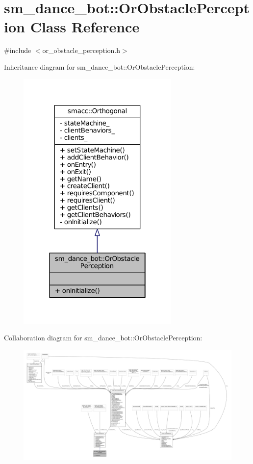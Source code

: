 \hypertarget{classsm__dance__bot_1_1OrObstaclePerception}{}\section{sm\+\_\+dance\+\_\+bot\+:\+:Or\+Obstacle\+Perception Class Reference}
\label{classsm__dance__bot_1_1OrObstaclePerception}


{\ttfamily \#include $<$or\+\_\+obstacle\+\_\+perception.\+h$>$}



Inheritance diagram for sm\+\_\+dance\+\_\+bot\+:\+:Or\+Obstacle\+Perception\+:
\nopagebreak
\begin{figure}[H]
\begin{center}
\leavevmode
\includegraphics[width=226pt]{classsm__dance__bot_1_1OrObstaclePerception__inherit__graph}
\end{center}
\end{figure}


Collaboration diagram for sm\+\_\+dance\+\_\+bot\+:\+:Or\+Obstacle\+Perception\+:
\nopagebreak
\begin{figure}[H]
\begin{center}
\leavevmode
\includegraphics[width=350pt]{classsm__dance__bot_1_1OrObstaclePerception__coll__graph}
\end{center}
\end{figure}

